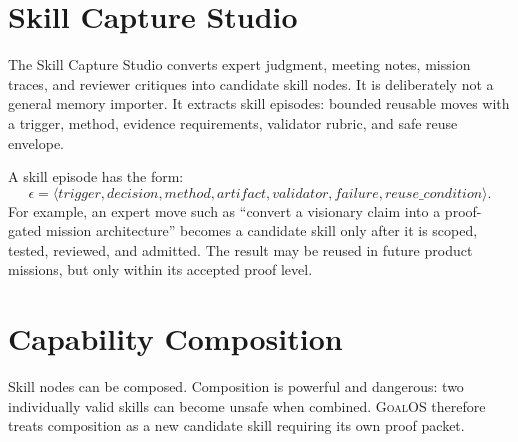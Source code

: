 \documentclass[10.5pt,oneside]{article}
\newcommand{\goalos}{\textsc{GoalOS}}
\begin{document}
\section{Skill Capture Studio}
The Skill Capture Studio converts expert judgment, meeting notes, mission traces, and reviewer critiques into candidate skill nodes. It is deliberately not a general memory importer. It extracts skill episodes: bounded reusable moves with a trigger, method, evidence requirements, validator rubric, and safe reuse envelope.

A skill episode has the form:
\[
  \epsilon = \langle trigger, decision, method, artifact, validator, failure, reuse\_condition \rangle.
\]
For example, an expert move such as ``convert a visionary claim into a proof-gated mission architecture'' becomes a candidate skill only after it is scoped, tested, reviewed, and admitted. The result may be reused in future product missions, but only within its accepted proof level.

\section{Capability Composition}
Skill nodes can be composed. Composition is powerful and dangerous: two individually valid skills can become unsafe when combined. \goalos{} therefore treats composition as a new candidate skill requiring its own proof packet.
\end{document}
